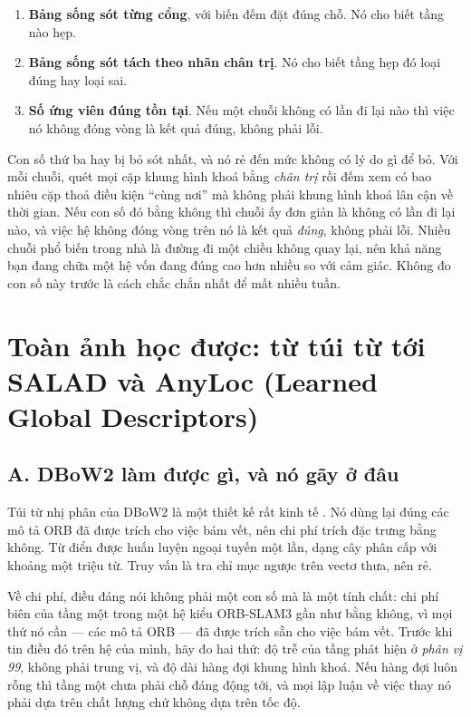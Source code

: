 \documentclass[../../deep_learning.tex]{subfiles}
\begin{document}
\begin{enumerate}
\item \textbf{Bảng sống sót từng cổng}, với biến đếm đặt đúng chỗ. Nó cho biết tầng nào hẹp.
\item \textbf{Bảng sống sót tách theo nhãn chân trị}. Nó cho biết tầng hẹp đó loại đúng hay loại sai.
\item \textbf{Số ứng viên đúng tồn tại}. Nếu một chuỗi không có lần đi lại nào thì việc nó không đóng vòng là kết quả đúng, không phải lỗi.
\end{enumerate}

Con số thứ ba hay bị bỏ sót nhất, và nó rẻ đến mức không có lý do gì để bỏ. Với mỗi chuỗi, quét mọi cặp khung hình khoá bằng \emph{chân trị} rồi đếm xem có bao nhiêu cặp thoả điều kiện ``cùng nơi'' mà không phải khung hình khoá lân cận về thời gian. Nếu con số đó bằng không thì chuỗi ấy đơn giản là không có lần đi lại nào, và việc hệ không đóng vòng trên nó là kết quả \emph{đúng}, không phải lỗi. Nhiều chuỗi phổ biến trong nhà là đường đi một chiều không quay lại, nên khả năng bạn đang chữa một hệ vốn đang đúng cao hơn nhiều so với cảm giác. Không đo con số này trước là cách chắc chắn nhất để mất nhiều tuần.

\section{Toàn ảnh học được: từ túi từ tới SALAD và AnyLoc (Learned Global Descriptors)}

\subsection{A. DBoW2 làm được gì, và nó gãy ở đâu}
Túi từ nhị phân của DBoW2 là một thiết kế rất kinh tế \cite{f29galvez2012bags}. Nó dùng lại đúng các mô tả ORB đã được trích cho việc bám vết, nên chi phí trích đặc trưng bằng không. Từ điển được huấn luyện ngoại tuyến một lần, dạng cây phân cấp với khoảng một triệu từ. Truy vấn là tra chỉ mục ngược trên vectơ thưa, nên rẻ.

Về chi phí, điều đáng nói không phải một con số mà là một tính chất: chi phí biên của tầng một trong một hệ kiểu ORB-SLAM3 gần như bằng không, vì mọi thứ nó cần --- các mô tả ORB --- đã được trích sẵn cho việc bám vết. Trước khi tin điều đó trên hệ của mình, hãy đo hai thứ: độ trễ của tầng phát hiện ở \emph{phân vị 99}, không phải trung vị, và độ dài hàng đợi khung hình khoá. Nếu hàng đợi luôn rỗng thì tầng một chưa phải chỗ đáng động tới, và mọi lập luận về việc thay nó phải dựa trên chất lượng chứ không dựa trên tốc độ.
\end{document}
